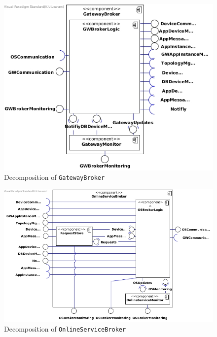 \begin{figure}[!htp]
	\centering
	\includegraphics[width=\textwidth]{images/component-diagram-GatewayBroker}
	\caption{Decomposition of \texttt{GatewayBroker}}
\end{figure}


\begin{figure}[!htp]
	\centering
	\includegraphics[width=\textwidth]{images/component-diagram-OnlineServiceBroker}
	\caption{Decomposition of \texttt{OnlineServiceBroker}}
\end{figure}
